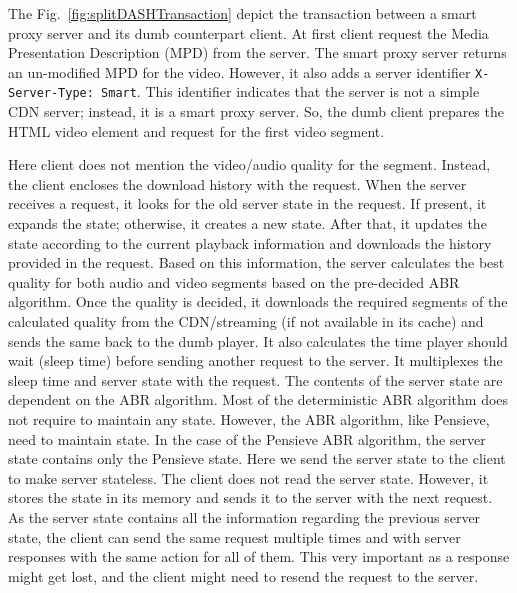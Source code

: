 The Fig.~\ref{fig:splitDASHTransaction} depict the transaction between a smart proxy server and its dumb counterpart client. At first client request the Media Presentation Description (MPD) from the server. The smart proxy server returns an un-modified MPD for the video. However, it also adds a server identifier {\tt X-Server-Type: Smart}. This identifier indicates that the server is not a simple CDN server; instead, it is a smart proxy server. So, the dumb client prepares the HTML video element and request for the first video segment.

Here client does not mention the video/audio quality for the segment. Instead, the client encloses the download history with the request. When the server receives a request, it looks for the old server state in the request. If present, it expands the state; otherwise, it creates a new state. After that, it updates the state according to the current playback information and downloads the history provided in the request. Based on this information, the server calculates the best quality for both audio and video segments based on the pre-decided ABR algorithm. Once the quality is decided, it downloads the required segments of the calculated quality from the CDN/streaming (if not available in its cache) and sends the same back to the dumb player. It also calculates the time player should wait (\ie sleep time) before sending another request to the server. It multiplexes the sleep time and server state with the request. The contents of the server state are dependent on the ABR algorithm. Most of the deterministic ABR algorithm does not require to maintain any state. However, the ABR algorithm, like Pensieve, need to maintain state. In the case of the Pensieve ABR algorithm, the server state contains only the Pensieve state.
Here we send the server state to the client to make server stateless. The client does not read the server state. However, it stores the state in its memory and sends it to the server with the next request. As the server state contains all the information regarding the previous server state, the client can send the same request multiple times and with server responses with the same action for all of them. This very important as a response might get lost, and the client might need to resend the request to the server.

